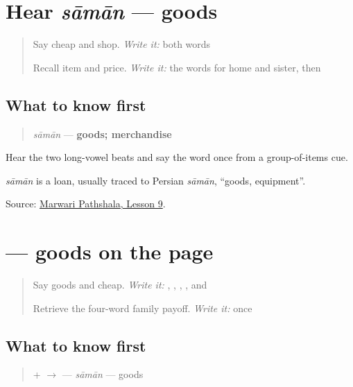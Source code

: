 \section[sāmān]{Hear \emph{sāmān} — goods}

\label{lesson:MW-C14-hear-samaan}



\begin{quote}
Say cheap and shop. \emph{Write it:} both words

Recall item and price. \emph{Write it:} the words for home and sister, then \textbf{}
\end{quote}

\subsection*{What to know first}
\begin{quote}
\emph{sāmān} — \textbf{goods; merchandise}
\end{quote}

Hear the two long-vowel beats and say the word once from a group-of-items cue.

\begin{cousinweb}
\emph{sāmān} is a loan, usually traced to Persian \emph{sāmān}, \textquotedblleft{}goods, equipment\textquotedblright{}.
\end{cousinweb}

\begin{tcolorbox}[breakable,colback=teal!4,colframe=teal!35!black,title={Before you move on}]
Source: \href{https://www.marwaripathshala.com/marwari-lesson-9-english}{Marwari Pathshala, Lesson 9}.
\end{tcolorbox}
\section[\texorpdfstring{\mw{सामान} (sāmān)}{सामान (sāmān)}]{ — goods on the page}

\label{lesson:MW-C14-samaan}



\begin{quote}
Say goods and cheap. \emph{Write it:} \textbf{}, \textbf{}, \textbf{}, \textbf{}, and \textbf{}

Retrieve the four-word family payoff. \emph{Write it:} \textbf{} once
\end{quote}

\subsection*{What to know first}
\begin{quote}
\textbf{} + \textbf{} $\to$ \textbf{} — \emph{sāmān} — goods
\end{quote}

